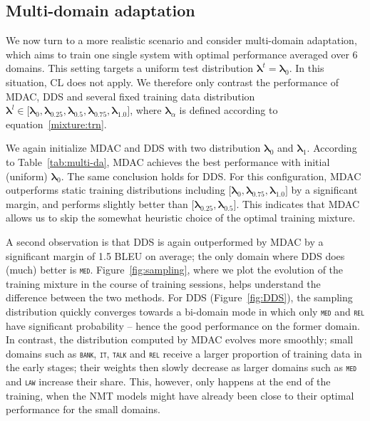 \documentclass[11pt]{article}
\newcommand{\domain}[1]{\texttt{\textsc{#1}}}
\newcommand{\vlambda}{\ensuremath{\boldsymbol\lambda}\xspace} %
\begin{document}
\subsection{Multi-domain adaptation}\label{ssec:mda}

We now turn to a more realistic scenario and consider multi-domain adaptation, which aims to train one single system with optimal performance averaged over 6 domains. This setting targets a uniform test distribution $\vlambda^t = \vlambda_0$. In this situation, CL \citep{Zhang19curriculum} does not apply. We therefore only contrast the performance of MDAC, DDS and several fixed training data distribution $\vlambda^l \in \big[ \vlambda_0, \vlambda_{0.25}, \vlambda_{0.5}, \vlambda_{0.75}, \vlambda_{1.0}\big]$, where $\vlambda_{\alpha}$ is defined according to equation~\eqref{mixture:trn}.

We again initialize MDAC and DDS with two distribution $\vlambda_0$ and $\vlambda_1$. According to Table~\ref{tab:multi-da}, MDAC achieves the best performance with initial (uniform) $\vlambda_0$. The same conclusion holds for DDS. For this configuration, MDAC outperforms static training distributions including $\big[ \vlambda_0, \vlambda_{0.75}, \vlambda_{1.0}\big]$ by a significant margin, and performs slightly better than $\big[ \vlambda_{0.25}, \vlambda_{0.5} \big]$. This indicates that MDAC allows us to skip the somewhat heuristic choice of the optimal training mixture.

A second observation is that DDS is again outperformed by MDAC by a significant margin of 1.5 BLEU on average; the only domain where DDS does (much) better is \domain{med}. Figure~\ref{fig:sampling}, where we plot the evolution of the training mixture in the course of training sessions, helps understand the difference between the two methods. For DDS (Figure~\ref{fig:DDS}), the sampling distribution quickly converges towards a bi-domain mode in which only \domain{med} and \domain{rel} have significant probability -- hence the good performance on the former domain. In contrast, the distribution computed by MDAC evolves more smoothly; small domains such as \domain{bank}, \domain{it}, \domain{talk} and \domain{rel} receive a larger proportion of training data in the early stages; their weights then slowly decrease as larger domains such as \domain{med} and \domain{law} increase their share. This, however, only happens at the end of the training, when the NMT models might have already been close to their optimal performance for the small domains.
\end{document}
